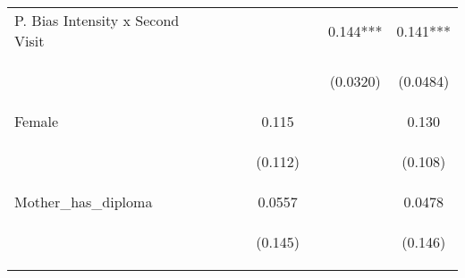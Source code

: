 \begin{center}
\begin{tabular}{lcccccc}
P. Bias Intensity x Second Visit &  &  &  &  & 0.144*** & 0.141*** \\
\vspace{4pt} & \begin{footnotesize}\end{footnotesize} & \begin{footnotesize}\end{footnotesize} & \begin{footnotesize}\end{footnotesize} & \begin{footnotesize}\end{footnotesize} & \begin{footnotesize}(0.0320)\end{footnotesize} & \begin{footnotesize}(0.0484)\end{footnotesize} \\
Female &  &  & 0.115 &  &  & 0.130 \\
\vspace{4pt} & \begin{footnotesize}\end{footnotesize} & \begin{footnotesize}\end{footnotesize} & \begin{footnotesize}(0.112)\end{footnotesize} & \begin{footnotesize}\end{footnotesize} & \begin{footnotesize}\end{footnotesize} & \begin{footnotesize}(0.108)\end{footnotesize} \\
Mother\_has\_diploma &  &  & 0.0557 &  &  & 0.0478 \\
\vspace{4pt} & \begin{footnotesize}\end{footnotesize} & \begin{footnotesize}\end{footnotesize} & \begin{footnotesize}(0.145)\end{footnotesize} & \begin{footnotesize}\end{footnotesize} & \begin{footnotesize}\end{footnotesize} & \begin{footnotesize}(0.146)\end{footnotesize} \\

\end{tabular}
\end{center}
